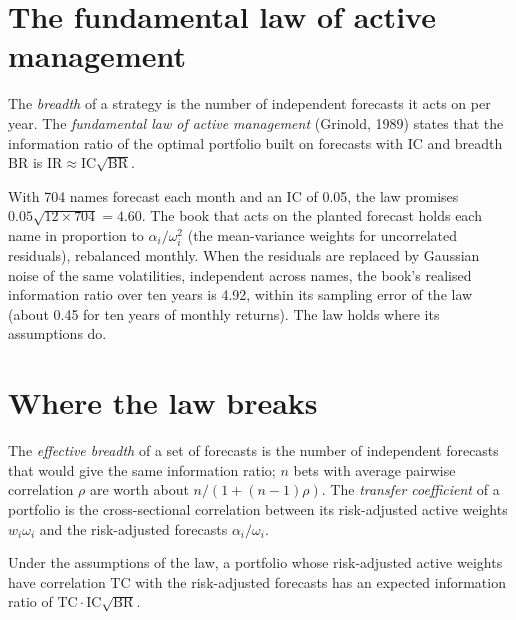 \section{The fundamental law of active management}

\begin{definition}\label{def:rs:from-signal-to-forecast:law}
The \emph{breadth} of a strategy is the number of independent forecasts it acts on per year. The \emph{fundamental law of active
management} (Grinold, 1989) states that the information ratio of the optimal portfolio built on
forecasts with  $\mathrm{IC}$ and breadth $\mathrm{BR}$ is $\mathrm{IR} \approx \mathrm{IC}\sqrt{\mathrm{BR}}$.
\end{definition}

With 704 names forecast each month and an IC of 0.05, the law promises $0.05\sqrt{12 \times 704} = 4.60$. The book that acts on the planted
forecast holds each name in proportion to $\alpha_i/\omega_i^2$ (the mean-variance weights for uncorrelated residuals), rebalanced monthly. When
the residuals are replaced by Gaussian noise of the same volatilities, independent across names, the book's realised information ratio over ten
years is 4.92, within its sampling error of the law (about 0.45 for ten years of monthly returns). The law holds where its assumptions do.

\section{Where the law breaks}

\begin{definition}\label{def:rs:from-signal-to-forecast:breadth}
The \emph{effective breadth} of a set of forecasts is the number of independent forecasts that would give the same
information ratio; $n$ bets with average pairwise correlation $\rho$ are worth about $n/(1 + (n - 1)\rho)$. The \emph{transfer
coefficient} of a portfolio is the cross-sectional correlation between its risk-adjusted active weights $w_i\omega_i$
and the risk-adjusted forecasts $\alpha_i/\omega_i$.
\end{definition}

\begin{proposition}\label{prop:rs:from-signal-to-forecast:generalised}
Under the assumptions of the law, a portfolio whose risk-adjusted active weights have correlation $\mathrm{TC}$ with the risk-adjusted forecasts
has an expected information ratio of $\mathrm{TC}\cdot\mathrm{IC}\sqrt{\mathrm{BR}}$.
\end{proposition}

